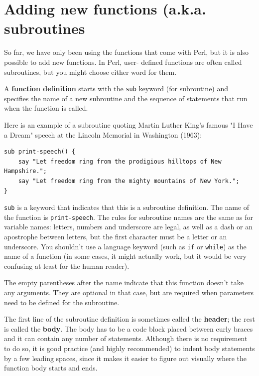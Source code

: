 \section{Adding new functions (a.k.a. subroutines}

So far, we have only been using the functions that come with Perl,
but it is also possible to add new functions. In Perl, user-
defined functions are often called subroutines, but you might choose 
either word for them. 

A {\bf function definition} starts with the {\tt sub} keyword (for
subroutine) and specifies the name of a new subroutine and
the sequence of statements that run when the function is called.

Here is an example of a subroutine quoting Martin Luther King's 
famous "I Have a Dream" speech at the Lincoln Memorial in 
Washington (1963):

\begin{verbatim}
sub print-speech() {
    say "Let freedom ring from the prodigious hilltops of New Hampshire.";
    say "Let freedom ring from the mighty mountains of New York.";
}
\end{verbatim}
%
{\tt sub} is a keyword that indicates that this is a subroutine
definition.  The name of the function is \verb"print-speech".  The
rules for subroutine names are the same as for variable names: letters,
numbers and underscore are legal, as well as a dash or an apostrophe between letters, but the first character
must be a letter or an underscore.  You shouldn't use a 
language keyword (such as {\tt if} or {\tt while}) as 
the name of a function (in some cases, it might actually work, 
but it would be very confusing at least for the human reader).

The empty parentheses after the name indicate that this function
doesn't take any arguments. They are optional in that case, but are 
required when parameters need to be defined for the subroutine.

The first line of the subroutine definition is sometimes called 
the {\bf header}; the rest is called the {\bf body}.  The body 
has to be a code block placed between curly braces and it can contain
any number of statements. Although there is no requirement to do 
so, it is good practice (and highly recommended) to indent body 
statements by a few leading spaces, since it makes it easier to 
figure out visually where the function body starts and ends.

